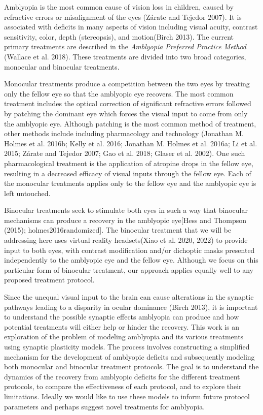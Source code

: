 \documentclass[
  sn-apa,
  pdflatex]{sn-jnl}
\theoremstyle{thmstyleone}%
\theoremstyle{thmstyletwo}%
\theoremstyle{thmstylethree}%
\begin{document}
Amblyopia is the most common cause of vision loss in children, caused by
refractive errors or misalignment of the eyes (Zárate and Tejedor 2007).
It is associated with deficits in many aspects of vision including
visual acuity, contrast sensitivity, color, depth (stereopsis), and
motion(Birch 2013). The current primary treatments are described in the
\emph{Amblyopia Preferred Practice Method} (Wallace et al. 2018). These
treatments are divided into two broad categories, monocular and
binocular treatments.

Monocular treatments produce a competition between the two eyes by
treating only the fellow eye so that the amblyopic eye recovers. The
most common treatment includes the optical correction of significant
refractive errors followed by patching the dominant eye which forces the
visual input to come from only the amblyopic eye. Although patching is
the most common method of treatment, other methods include including
pharmacology and technology (Jonathan M. Holmes et al. 2016b; Kelly et
al. 2016; Jonathan M. Holmes et al. 2016a; Li et al. 2015; Zárate and
Tejedor 2007; Gao et al. 2018; Glaser et al. 2002). One such
pharmacological treatment is the application of atropine drops in the
fellow eye, resulting in a decreased efficacy of visual inputs through
the fellow eye. Each of the monocular treatments applies only to the
fellow eye and the amblyopic eye is left untouched.

Binocular treatments seek to stimulate both eyes in such a way that
binocular mechanisms can produce a recovery in the amblyopic eye{[}Hess
and Thompson (2015); holmes2016randomized{]}. The binocular treatment
that we will be addressing here uses virtual reality headsets(Xiao et
al. 2020, 2022) to provide input to both eyes, with contrast
modification and/or dichoptic masks presented independently to the
amblyopic eye and the fellow eye. Although we focus on this particular
form of binocular treatment, our approach applies equally well to any
proposed treatment protocol.

Since the unequal visual input to the brain can cause alterations in the
synaptic pathways leading to a disparity in ocular dominance (Birch
2013), it is important to understand the possible synaptic effects
amblyopia can produce and how potential treatments will either help or
hinder the recovery. This work is an exploration of the problem of
modeling amblyopia and its various treatments using synaptic plasticity
models. The process involves constructing a simplified mechanism for the
development of amblyopic deficits and subsequently modeling both
monocular and binocular treatment protocols. The goal is to understand
the dynamics of the recovery from amblyopic deficits for the different
treatment protocols, to compare the effectiveness of each protocol, and
to explore their limitations. Ideally we would like to use these models
to inform future protocol parameters and perhaps suggest novel
treatments for amblyopia.
\end{document}
